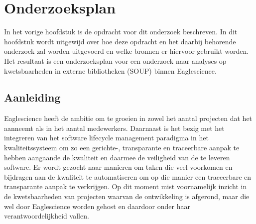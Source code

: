 \chapter{Onderzoeksplan}\label{ch:onderzoekPlan}

In het vorige hoofdstuk is de opdracht voor dit onderzoek beschreven. In dit hoofdstuk wordt uitgewijd over hoe deze opdracht en het daarbij behorende onderzoek zal worden uitgevoerd en welke bronnen er hiervoor gebruikt worden. Het resultaat is een onderzoeksplan voor een onderzoek naar analyses op kwetsbaarheden in externe bibliotheken (SOUP) binnen Eaglescience.


\section{Aanleiding}\label{sec:OP_aanleiding}
Eaglescience heeft de ambitie om te groeien in zowel het aantal projecten dat het aanneemt als in het aantal medewerkers. Daarnaast is het bezig met het integreren van het software lifecycle management paradigma in het kwaliteitssysteem om zo een gerichte-, transparante en traceerbare aanpak te hebben aangaande de kwaliteit en daarmee de veiligheid van de te leveren software. Er wordt gezocht naar manieren om taken die veel voorkomen en bijdragen aan de kwaliteit te automatiseren om op die manier een traceerbare en transparante aanpak te verkrijgen. Op dit moment mist voornamelijk inzicht in de kwetsbaarheden van projecten waarvan de ontwikkeling is afgerond, maar die wel door Eaglescience worden gehost en daardoor onder haar verantwoordelijkheid vallen.



